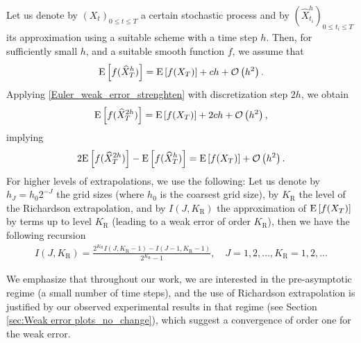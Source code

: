 Let us denote by $(X_t)_{0 \le t \le T}$ a certain stochastic process and by $(\hat{X}_{t_i}^h)_{0 \le  t_i \le T}$ its approximation using a suitable  scheme with a time step $h$.  Then, for sufficiently small $h$, and a suitable smooth function $f$, we assume that
\begin{align}\label{Euler_weak_error_strenghten}
	\mathrm{E}\left[f(\widehat{X}_T^h)\right]= \mathrm{E}\left[f(X_T)\right] + c h +{\mathcal{O}}\left(h^2\right) .
\end{align}
Applying \eqref{Euler_weak_error_strenghten} with discretization step $2h$, we  obtain
\begin{align*}
	\mathrm{E}\left[f(\widehat{X}_T^{2h})\right]= \mathrm{E}\left[f(X_T)\right] + 2 c h +{\mathcal{O}}\left(h^2\right) ,
\end{align*}
implying
\begin{align*}
	2 \mathrm{E}\left[f(\widehat{X}_T^{2h})\right]- \mathrm{E}\left[f(\widehat{X}_T^{h})\right] =\mathrm{E}\left[f(X_T)\right] + {\mathcal{O}}\left(h^2\right) .
\end{align*}
For higher levels of extrapolations, we use the following: Let us denote by $h_J=h_0 2^{-J}$ the grid sizes (where $h_0$ is the coarsest grid size), by $K_\text{R}$ the level of the Richardson extrapolation, and by $I(J,K_\text{R})$ the approximation of $\mathrm{E}\left[f(X_T)\right]$ by terms up to level $K_\text{R}$ (leading to a weak error of order $K_\text{R}$), then we have the following recursion 
\begin{align*}
I(J,K_\text{R})=\frac{2^{K_\text{R}}I(J,K_\text{R}-1)-I(J-1,K_\text{R}-1)}{2^{K_\text{R}}-1},\quad J=1,2,\dots, K_\text{R}=1,2,\dots
\end{align*}
\begin{remark}
We emphasize that throughout our work, we are interested in the pre-asymptotic regime (a small number of time steps), and the use of Richardson extrapolation is justified by our observed experimental results in that regime (see Section \ref{sec:Weak error plots_no_change}),  which suggest  a convergence of order one for the weak error. 
\end{remark}

%
